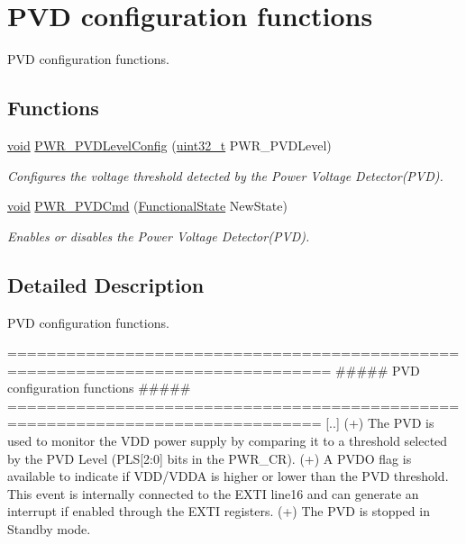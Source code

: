 \hypertarget{group___p_w_r___group2}{\section{P\-V\-D configuration functions}
\label{group___p_w_r___group2}
}


P\-V\-D configuration functions.  


\subsection*{Functions}
\begin{DoxyCompactItemize}
\item 
\hyperlink{group___n_a_m_e_ga18028b8badbf1ea7e704ccac3c488e82}{void} \hyperlink{group___p_w_r___group2_ga237c143ef6aa55abb8049fa7bf24ab8f}{P\-W\-R\-\_\-\-P\-V\-D\-Level\-Config} (\hyperlink{stdint_8h_a435d1572bf3f880d55459d9805097f62}{uint32\-\_\-t} P\-W\-R\-\_\-\-P\-V\-D\-Level)
\begin{DoxyCompactList}\small\item\em Configures the voltage threshold detected by the Power Voltage Detector(\-P\-V\-D). \end{DoxyCompactList}\item 
\hyperlink{group___n_a_m_e_ga18028b8badbf1ea7e704ccac3c488e82}{void} \hyperlink{group___p_w_r___group2_ga42cad476b816e0a33594a933b3ed1acd}{P\-W\-R\-\_\-\-P\-V\-D\-Cmd} (\hyperlink{group___exported__types_gac9a7e9a35d2513ec15c3b537aaa4fba1}{Functional\-State} New\-State)
\begin{DoxyCompactList}\small\item\em Enables or disables the Power Voltage Detector(\-P\-V\-D). \end{DoxyCompactList}\end{DoxyCompactItemize}


\subsection{Detailed Description}
P\-V\-D configuration functions. \begin{DoxyVerb} ===============================================================================
                    ##### PVD configuration functions #####
  ==============================================================================
  [..]
  (+) The PVD is used to monitor the VDD power supply by comparing it to a threshold
      selected by the PVD Level (PLS[2:0] bits in the PWR_CR).
  (+) A PVDO flag is available to indicate if VDD/VDDA is higher or lower than the 
      PVD threshold. This event is internally connected to the EXTI line16
      and can generate an interrupt if enabled through the EXTI registers.
  (+) The PVD is stopped in Standby mode.\end{DoxyVerb}



